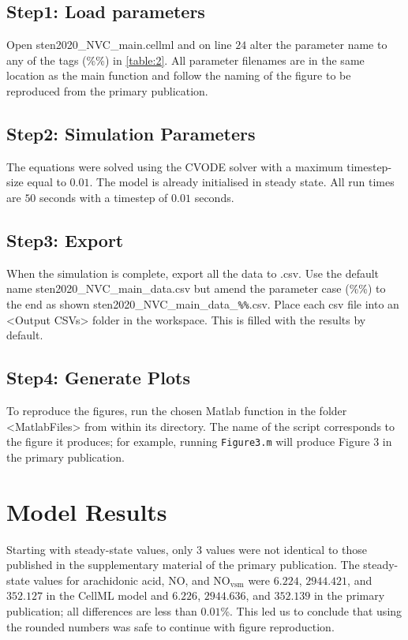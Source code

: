 \documentclass[fleqn,10pt]{physiome}
\begin{document}
\subsection{Step1: Load parameters} 
Open sten2020\_NVC\_main.cellml and on line $24$ alter the parameter name to any of the tags (\%\%) in \autoref{table:2}. All parameter filenames are in the same location as the main function and follow the naming of the figure to be reproduced from the primary publication.
\subsection{Step2: Simulation Parameters} 
The equations were solved using the CVODE solver with a maximum timestep-size equal to $0.01$. The model is already initialised in steady state. All run times are $50$ seconds with a timestep of $0.01$ seconds. 

\subsection{Step3: Export} 
When the simulation is complete, export all the data to .csv. Use the default name sten2020\_NVC\_main\_data.csv but amend the parameter case (\%\%) to the end as shown sten2020\_NVC\_main\_data\_\verb|%%|.csv. Place each csv file into an <Output CSVs> folder in the workspace. This is filled with the results by default. 

\subsection{Step4: Generate Plots} 
To reproduce the figures, run the chosen Matlab function in the folder <MatlabFiles> from within its directory. The name of the script corresponds to the figure it produces; for example, running \texttt{Figure3.m} will produce Figure $3$ in the primary publication. 

\section{Model Results}

Starting with steady-state values, only $3$ values were not identical to those published in the supplementary material of the primary publication. The steady-state values for arachidonic acid, NO, and NO$_\mathrm{vsm}$ were $6.224$, $2944.421$, and $352.127$ in the CellML model and $6.226$, $2944.636$, and $352.139$ in the primary publication; all differences are less than $0.01$\%. This led us to conclude that using the rounded numbers was safe to continue with figure reproduction.
\end{document}
